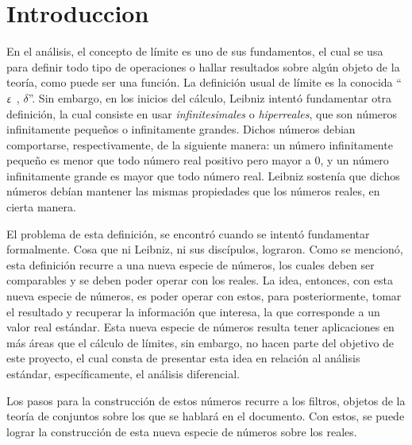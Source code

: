 \section{Introduccion}

En el análisis, el concepto de límite es uno de sus fundamentos,
el cual se usa para definir todo tipo de operaciones o hallar
resultados sobre algún objeto de la teoría, como puede ser una
función. La definición usual de límite es la conocida
``$\upvarepsilon$ , $\delta$''. Sin embargo, en los inicios del cálculo,
Leibniz intentó fundamentar otra definición, la cual consiste en
usar \emph{infinitesimales} o \emph{hiperreales}, que son números
infinitamente pequeños o infinitamente grandes. Dichos números debian
comportarse, respectivamente, de la siguiente manera:
un número infinitamente pequeño es menor que todo número real positivo
pero mayor a $0$, y un número infinitamente grande es mayor que todo
número real. Leibniz sostenía que dichos números debían mantener las
mismas propiedades que los números reales, en cierta manera.

El problema de esta definición, se encontró cuando se intentó fundamentar
formalmente. Cosa que ni Leibniz, ni sus discípulos, lograron.
Como se mencionó, esta definición recurre a una nueva especie de números, los cuales
deben ser comparables y se deben poder operar con los reales. La idea,
entonces, con esta nueva especie de números, es poder operar con estos,
para posteriormente, tomar el resultado y recuperar la información que interesa,
la que corresponde a un valor real estándar. Esta nueva especie de números
resulta tener aplicaciones en más áreas que el cálculo de límites, sin
embargo, no hacen parte del objetivo de este proyecto, el cual consta de
presentar esta idea en relación al análisis estándar, específicamente,
el análisis diferencial.

Los pasos para la construcción de estos números recurre a los filtros,
objetos de la teoría de conjuntos sobre los que se hablará en el
documento. Con estos, se puede lograr la construcción de esta nueva especie
de números sobre los reales.
